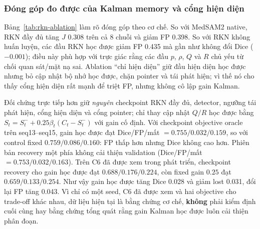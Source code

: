 \documentclass[a4paper,12pt]{report}
\begin{document}
\subsubsection{Đóng góp đo được của Kalman memory và cổng hiện diện}

Bảng~\ref{tab:rkn-ablation} làm rõ đóng góp theo cơ chế. So với MedSAM2 native, RKN đầy đủ tăng $J$ 0.308 trên cả 8 chuỗi và giảm FP 0.398. So với RKN không huấn luyện, các đầu RKN học được giảm FP 0.435 mà gần như không đổi Dice ($-0.001$); điều này phù hợp với trực giác rằng các đầu $p$, $\rho$, $Q$ và $R$ chủ yếu từ chối quan sát/mặt nạ sai. Ablation ``chỉ hiện diện'' giữ đầu hiện diện học được nhưng bỏ cập nhật bộ nhớ học được, chặn pointer và tái phát hiện; vì thế nó cho thấy cổng hiện diện rất mạnh để triệt FP, nhưng không cô lập gain Kalman.

Đối chứng trực tiếp hơn giữ \emph{nguyên} checkpoint RKN đầy đủ, detector, ngưỡng tái phát hiện, cổng hiện diện và cổng pointer; chỉ thay cập nhật $Q/R$ học được bằng $S_t=S_t^-+0.25\beta_t(C_t-S_t^-)$ với gain cố định. Với checkpoint objective oracle trên seq13--seq15, gain học được đạt Dice/FP/mất $=0.755/0.032/0.159$, so với control fixed $0.759/0.086/0.160$: FP thấp hơn nhưng Dice không cao hơn. Phiên bản recovery một phía không cải thiện validation (Dice/FP/mất $=0.753/0.032/0.163$). Trên C6 đã được xem trong phát triển, checkpoint recovery cho gain học được đạt $0.688/0.176/0.224$, còn fixed gain $0.25$ đạt $0.659/0.133/0.254$. Như vậy gain học được tăng Dice 0.028 và giảm lost 0.031, đổi lại FP tăng 0.043. Vì chỉ có một seed, C6 đã được xem và hai objective cho trade-off khác nhau, dữ liệu hiện tại là bằng chứng cơ chế, \textbf{không} phải kiểm định cuối cùng hay bằng chứng tổng quát rằng gain Kalman học được luôn cải thiện phân đoạn.

\begin{table}[htbp]
\centering
\caption{Ablation trên C6: tác động của hệ thống RKN (hiệu RKN đầy đủ trừ baseline; trung bình theo chuỗi).}
\label{tab:rkn-ablation}
\end{table}
\end{document}
